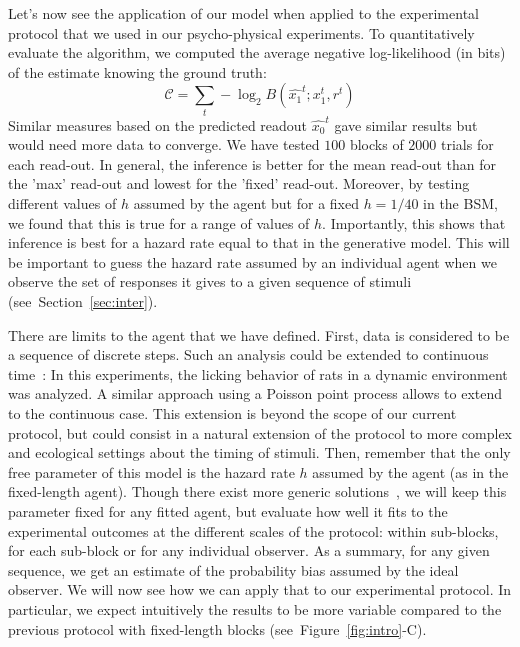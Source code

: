 \documentclass[12pt,english]{article}%
\newcommand{\eql}[1]{\begin{equation}#1\end{equation}}
\newcommand{\Cc}{\mathcal{C}}
\newcommand{\citep}[1]{\parencite{#1}}
\newcommand{\seeFig}[1]{Figure~\ref{fig:#1}}
\newcommand{\seeSec}[1]{Section~\ref{sec:#1}}
\begin{document}
Let's now see the application of our model when applied
to the experimental protocol
that we used in our psycho-physical experiments.
To quantitatively evaluate the algorithm,
we computed the average negative log-likelihood (in bits) of the estimate
knowing the ground truth:
\eql{
\Cc =  \sum_{t} -\log_2 B(\hat{x_1}^t ; x_1^t, r^t )
}
Similar measures based on the predicted readout $\hat{x_0}^t$
gave similar results but would need more data to converge.
We have tested $100$ blocks of $2000$ trials for each read-out.
In general, the inference is better for the mean read-out
than for the 'max' read-out and lowest for the 'fixed' read-out.
Moreover, by testing different values of $h$ assumed by the agent
but for a fixed $h=1/40$ in the BSM,
we found that this is true for a range of values of $h$.
Importantly, this shows that inference is best for a hazard rate
equal to that in the generative model.
This will be important to guess the hazard rate assumed by an individual agent
when we observe the set of responses it gives to a given sequence of stimuli
(see~\seeSec{inter}).

There are limits to the agent that we have defined.
First, data is considered to be a sequence of discrete steps.
Such an analysis could be extended to continuous time~\citep{RadilloBrady2017}:
In this experiments, the licking behavior of rats in a dynamic environment
was analyzed.
A similar approach using a Poisson point process allows to extend to the continuous case.
This extension is beyond the scope of our current protocol,
but could consist in a natural extension of the protocol
to more complex and ecological settings about the timing of stimuli.
Then, remember that the only free parameter of this model is the hazard rate $h$
assumed by the agent (as in the fixed-length agent).
Though there exist more generic solutions~\citep{Wilson13,Wilson18},
we will keep this parameter fixed for any fitted agent, but evaluate
how well it fits to the experimental outcomes at the different scales of the protocol:
within sub-blocks, for each sub-block or for any individual observer.
As a summary, for any given sequence,
we get an estimate of the probability bias assumed  by the ideal observer.
We will now see how we can apply that to our experimental protocol.
In particular, we expect intuitively the results to be more variable
compared to the previous protocol with fixed-length blocks (see~\seeFig{intro}-C).
\end{document}
